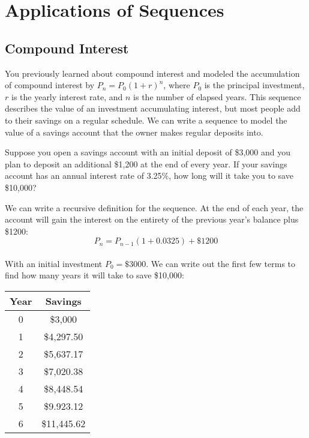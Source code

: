 \section{Applications of Sequences}
\subsection{Compound Interest}
You previously learned about compound interest and modeled the accumulation of compound interest by $P_n = P_0(1 + r)^n$, where $P_0$ is the principal investment, $r$ is the yearly interest rate, and $n$ is the number of elapsed years. This sequence describes the value of an investment accumulating interest, but most people add to their savings on a regular schedule. We can write a sequence to model the value of a savings account that the owner makes regular deposits into. 

Suppose you open a savings account with an initial deposit of \$3,000 and you plan to deposit an additional \$1,200 at the end of every year. If your savings account has an annual interest rate of 3.25\%, how long will it take you to save \$10,000?

We can write a recursive definition for the sequence. At the end of each year, the account will gain the interest on the entirety of the previous year's balance plus \$1200:
$$P_n = P_{n-1}(1+0.0325) + \$1200$$\\
With an initial investment $P_0 = \$3000$. We can write out the first few terms to find how many years it will take to save \$10,000:
\begin{center}
\begin{tabular}{|c|c|}\hline
Year & Savings\\
\hline
0 & \$3,000\\
\hline
1 & \$4,297.50\\
\hline
2 & \$5,637.17\\
\hline
3 & \$7,020.38\\
\hline
4 & \$8,448.54\\
\hline
5 & \$9.923.12\\
\hline
6 & \$11,445.62
\end{tabular}
\end{center}

